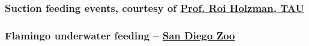 \begin{frame}[label=app-22]
    \frametitle{Suction feeding events, courtesy of \href{https://www.dropbox.com/s/wcytdkxuxxvn4q0/fish_feeding.mp4?raw=1}{Prof. Roi Holzman, TAU}}
\end{frame}
    
    \begin{frame}[label=app-23]
    \frametitle{Flamingo underwater feeding -- \href{https://www.dropbox.com/s/ic0l5npzon834l9/flamingo.mp4?raw=1}{San Diego Zoo}}
    \begin{center}
    \end{center}
    \end{frame}
    
    
